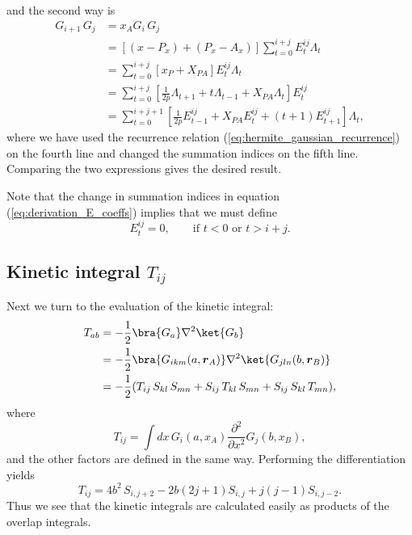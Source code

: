 and the second way is
\begin{equation}
\label{eq:derivation_E_coeffs}
\begin{split}
 G_{i+1}\,G_j & = x_A G_i\,G_j \\
              & = [(x - P_x) + (P_x - A_x)]\sum_{t=0}^{i+j} E^{ij}_t \Lambda_t\\
              & = \sum_{t=0}^{i+j}[x_P + X_{PA}] E^{ij}_t \Lambda_t \\
              & = \sum_{t=0}^{i+j}[\frac{1}{2p}\Lambda_{t+1} + t\Lambda_{t-1} + X_{PA}\Lambda_t]E^{ij}_t \\
              & = \sum_{t=0}^{i+j+1}[\frac{1}{2p}E^{ij}_{t-1} + X_{PA}E^{ij}_t + (t+1)E^{ij}_{t+1}] \Lambda_t,
\end{split}
\end{equation}
where we have used the recurrence relation (\ref{eq:hermite_gaussian_recurrence}) on the fourth line and changed the summation indices on the fifth line. Comparing the two expressions gives the
desired result.

Note that the change in summation indices in equation (\ref{eq:derivation_E_coeffs}) implies that we must define
\begin{equation}
 E^{ij}_t = 0, \qquad \text{if }t<0\text{ or }t > i + j.
\end{equation}



\subsection{Kinetic integral $T_{ij}$}
Next we turn to the evaluation of the kinetic integral:
\begin{equation}
\begin{split}
T_{ab} & = -\frac{1}{2}\bra{G_a}\nabla^2\ket{G_b} \\
       & = -\frac{1}{2}\bra{G_{ikm}(a, \vec r_A)}\nabla^2\ket{G_{jln}(b, \vec r_B)} \\
       & = -\frac{1}{2}(T_{ij}\,S_{kl}\,S_{mn} + S_{ij}\,T_{kl}\,S_{mn} + S_{ij}\,S_{kl}\,T_{mn}),
\end{split}
\end{equation}
where
\begin{equation}
 T_{ij} = \int dx \,G_i(a,x_A)\frac{\partial^2}{\partial x^2}G_j(b,x_B),
\end{equation}
and the other factors are defined in the same way. Performing the differentiation yields
\begin{equation}
 T_{ij} = 4b^2\,S_{i,j+2} - 2b(2j + 1)S_{i,j} + j(j-1)S_{i,j-2}.
\end{equation}
Thus we see that the kinetic integrals are calculated easily as products of the overlap integrals.


